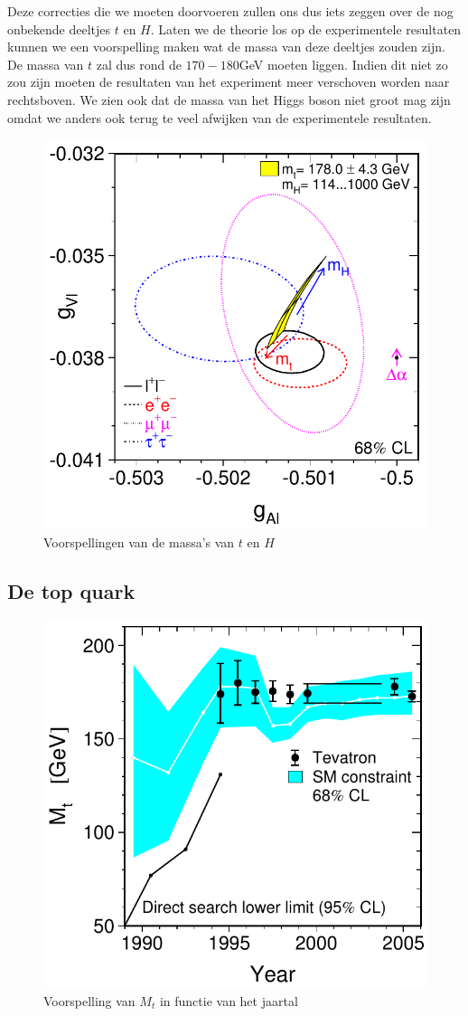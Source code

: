 \documentclass[../main.tex]{subfiles}
\begin{document}
Deze correcties die we moeten doorvoeren zullen ons dus iets zeggen over de nog onbekende deeltjes $t$ en $H$. Laten we de theorie los op de experimentele resultaten kunnen we een voorspelling maken wat de massa van deze deeltjes zouden zijn. De massa van $t$ zal dus rond de $170-180$GeV moeten liggen. Indien dit niet zo zou zijn moeten de resultaten van het experiment meer verschoven worden naar rechtsboven. We zien ook dat de massa van het Higgs boson niet groot mag zijn omdat we anders ook terug te veel afwijken van de experimentele resultaten.

\begin{figure}[h]
    \centering
    \includegraphics[width=0.4\linewidth]{elektroweak_precision_tests/massa_t_h_voorspellen.png}
    \caption{Voorspellingen van de massa's van $t$ en $H$}%
    \label{fig:elektroweak_precision_tests/massa_t_h_voorspellen}
\end{figure}

\subsection{De top quark}%
\label{sub:de_top_quark}

\begin{figure}[h]
    \centering
    \includegraphics[width=0.4\linewidth]{elektroweak_precision_tests/t_massa_voorspelling.png}
    \caption{Voorspelling van $M_t$ in functie van het jaartal}%
    \label{fig:elektroweak_precision_tests/t_massa_voorspelling}
\end{figure}
\end{document}
